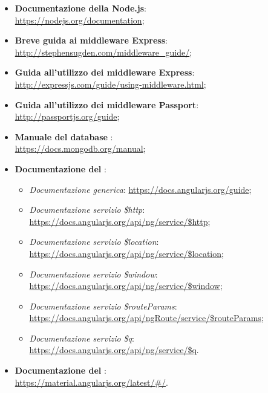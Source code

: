 \begin{itemize}
\item \textbf{Documentazione della  Node.js}: \\ \url{https://nodejs.org/documentation};
\item \textbf{Breve guida ai middleware Express}: \\ \url{http://stephensugden.com/middleware_guide/};
\item \textbf{Guida all'utilizzo dei middleware Express}: \\ \url{http://expressjs.com/guide/using-middleware.html};
\item \textbf{Guida all'utilizzo dei middleware Passport}: \\ \url{http://passportjs.org/guide};
\item \textbf{Manuale del database }: \\ \url{https://docs.mongodb.org/manual};
\item \textbf{Documentazione del  }:
\begin{itemize}
\item \textit{Documentazione generica}: \url{https://docs.angularjs.org/guide};
\item \textit{Documentazione servizio \$http}: \url{https://docs.angularjs.org/api/ng/service/$http}; %
\item \textit{Documentazione servizio \$location}: \url{https://docs.angularjs.org/api/ng/service/$location}; %
\item \textit{Documentazione servizio \$window}: \url{https://docs.angularjs.org/api/ng/service/$window}; %
\item \textit{Documentazione servizio \$routeParams}: \url{https://docs.angularjs.org/api/ngRoute/service/$routeParams}; %
\item \textit{Documentazione servizio \$q}: \url{https://docs.angularjs.org/api/ng/service/$q}.%
\end{itemize}
\item \textbf{Documentazione del  }:\\ \url{https://material.angularjs.org/latest/#/}.
\end{itemize}
